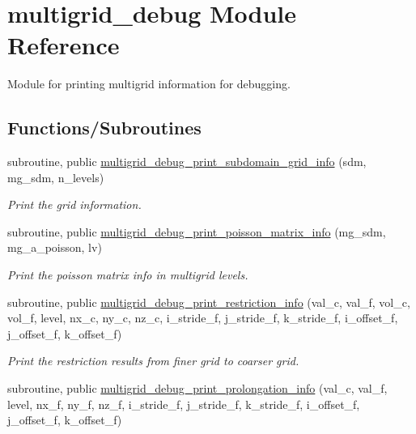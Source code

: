 \hypertarget{namespacemultigrid__debug}{}\section{multigrid\+\_\+debug Module Reference}
\label{namespacemultigrid__debug}


Module for printing multigrid information for debugging.  


\subsection*{Functions/\+Subroutines}
\begin{DoxyCompactItemize}
\item 
subroutine, public \hyperlink{namespacemultigrid__debug_aa5dcd15e32c5dc719638263835c5ed43}{multigrid\+\_\+debug\+\_\+print\+\_\+subdomain\+\_\+grid\+\_\+info} (sdm, mg\+\_\+sdm, n\+\_\+levels)
\begin{DoxyCompactList}\small\item\em Print the grid information. \end{DoxyCompactList}\item 
subroutine, public \hyperlink{namespacemultigrid__debug_aae55d6fc6a22d97825619d5bb58a1b88}{multigrid\+\_\+debug\+\_\+print\+\_\+poisson\+\_\+matrix\+\_\+info} (mg\+\_\+sdm, mg\+\_\+a\+\_\+poisson, lv)
\begin{DoxyCompactList}\small\item\em Print the poisson matrix info in multigrid levels. \end{DoxyCompactList}\item 
subroutine, public \hyperlink{namespacemultigrid__debug_a99e36a8239b91fbf3681cd88ab8f06dd}{multigrid\+\_\+debug\+\_\+print\+\_\+restriction\+\_\+info} (val\+\_\+c, val\+\_\+f, vol\+\_\+c, vol\+\_\+f, level, nx\+\_\+c, ny\+\_\+c, nz\+\_\+c, i\+\_\+stride\+\_\+f, j\+\_\+stride\+\_\+f, k\+\_\+stride\+\_\+f, i\+\_\+offset\+\_\+f, j\+\_\+offset\+\_\+f, k\+\_\+offset\+\_\+f)
\begin{DoxyCompactList}\small\item\em Print the restriction results from finer grid to coarser grid. \end{DoxyCompactList}\item 
subroutine, public \hyperlink{namespacemultigrid__debug_a4e9617a0cc65c4169970f289117de416}{multigrid\+\_\+debug\+\_\+print\+\_\+prolongation\+\_\+info} (val\+\_\+c, val\+\_\+f, level, nx\+\_\+f, ny\+\_\+f, nz\+\_\+f, i\+\_\+stride\+\_\+f, j\+\_\+stride\+\_\+f, k\+\_\+stride\+\_\+f, i\+\_\+offset\+\_\+f, j\+\_\+offset\+\_\+f, k\+\_\+offset\+\_\+f)

\end{DoxyCompactItemize}
